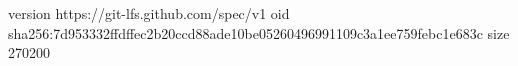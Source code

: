 version https://git-lfs.github.com/spec/v1
oid sha256:7d953332ffdffec2b20ccd88ade10be05260496991109c3a1ee759febc1e683c
size 270200
